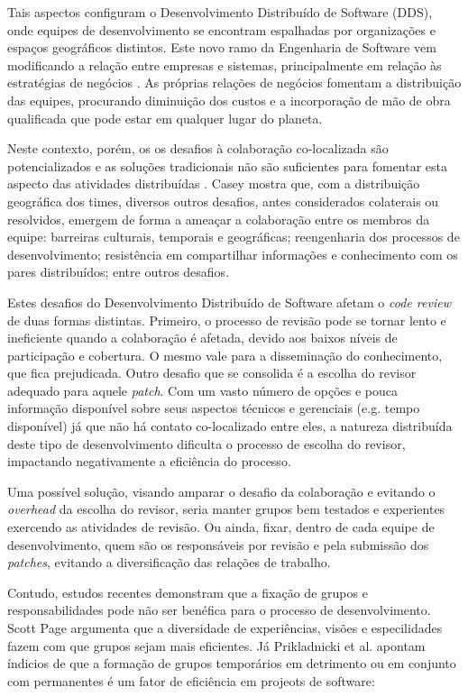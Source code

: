 \documentclass[preprint,12pt]{elsarticle}
\begin{document}
  Tais aspectos configuram o Desenvolvimento Distribuído de Software (DDS), onde equipes de desenvolvimento se encontram espalhadas por organizações e espaços geográficos distintos. Este novo ramo da Engenharia de Software vem modificando a relação entre empresas e sistemas, principalmente em relação às estratégias de negócios \cite{audy2007}. As próprias relações de negócios fomentam a distribuição das equipes, procurando diminuição dos custos e a incorporação de mão de obra qualificada que pode estar em qualquer lugar do planeta.

  Neste contexto, porém, os os desafios à colaboração co-localizada são potencializados e as soluções tradicionais não são suficientes para fomentar esta aspecto das atividades distribuídas \cite{nicolaci2011}. Casey \cite{casey2010} mostra que, com a distribuição geográfica dos times, diversos outros desafios, antes considerados colaterais ou resolvidos, emergem de forma a ameaçar a colaboração entre os membros da equipe: barreiras culturais, temporais e geográficas; reengenharia dos processos de desenvolvimento; resistência em compartilhar informações e conhecimento com os pares distribuídos; entre outros desafios.

  Estes desafios do Desenvolvimento Distribuído de Software afetam o \textit{code review} de duas formas distintas. Primeiro, o processo de revisão pode se tornar lento e ineficiente quando a colaboração é afetada, devido aos baixos níveis de participação e cobertura. O mesmo vale para a disseminação do conhecimento, que fica prejudicada. Outro desafio que se consolida é a escolha do revisor adequado para aquele \textit{patch}. Com um vasto número de opções e pouca informação disponível sobre seus aspectos técnicos e gerenciais (e.g. tempo disponível) já que não há contato co-localizado entre eles, a natureza distribuída deste tipo de desenvolvimento dificulta o processo de escolha do revisor, impactando negativamente a eficiência do processo.

  Uma possível solução, visando amparar o desafio da colaboração e evitando o \textit{overhead} da escolha do revisor, seria manter grupos bem testados e experientes exercendo as atividades de revisão. Ou ainda, fixar, dentro de cada equipe de desenvolvimento, quem são os responsáveis por revisão e pela submissão dos \textit{patches}, evitando a diversificação das relações de trabalho.

  Contudo, estudos recentes demonstram que a fixação de grupos e responsabilidades pode não ser benéfica para o processo de desenvolvimento. Scott Page \cite{page2008} argumenta que a diversidade de experiências, visões e especilidades fazem com que grupos sejam mais eficientes. Já Prikladnicki et al. \cite{prikladnicki2017} apontam índicios de que a formação de grupos temporários em detrimento ou em conjunto com permanentes é um fator de eficiência em projeots de software:
\end{document}
